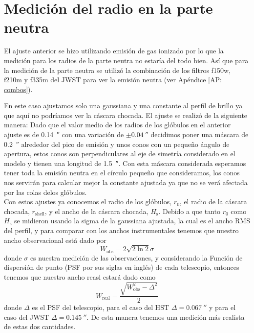 \documentclass{book}
\begin{document}
\section{Medición del radio en la parte neutra} \label{Sec : radio neutro}

El ajuste anterior se hizo utilizando emisión de gas ionizado por lo que la medición para los radios de la parte neutra no estaría del todo bien. Así que para la medición de la parte neutra se utilizó la combinación de los filtros f150w, f210m y f335m del JWST para ver la emisión neutra (ver Apéndice \ref{AP: combos}). 

En este caso ajustamos solo una gaussiana y una constante al perfil de brillo ya que aquí no podríamos ver la cáscara chocada. El ajuste se realizó de la siguiente manera: Dado que el valor medio de los radios de los glóbulos en el anterior ajuste es de  \SI{0.14}{\arcsecond} con una variación de $\pm\SI{0.04}{\arcsecond}$ decidimos poner una máscara de \SI{0.2}{\arcsecond} alrededor del pico de emisión y unos conos con un pequeño ángulo de apertura, estos conos son perpendiculares al eje de simetría considerado en el modelo y tienen una longitud de \SI{1.5}{\arcsecond}. Con esta máscara considerada esperamos tener toda la emisión neutra en el círculo pequeño que consideramos, los conos nos servirán para calcular mejor la constante ajustada ya que no se verá afectada por las colas delos glóbulos. \\

Con estos ajustes ya conocemos el radio de los glóbulos, $r_0$, el radio de la cáscara chocada, $r_\mathrm{shell}$, y el ancho de la cáscara chocada, $H_\mathrm{s}$.  
Debido a que tanto  $r_0$ como  $H_\mathrm{s}$ se midieron usando la sigma de la gaussiana ajustada, la cual es el ancho RMS del perfil, y para comparar con los anchos instrumentales tenemos que nuestro ancho observacional está dado por
\begin{equation}
    W_\mathrm{obs}= 2\sqrt{2\ln{2}}\sigma
\end{equation}
donde $\sigma$ es nuestra medición de las observaciones, y considerando la Función de dispersión de punto (PSF por sus siglas en inglés) de cada telescopio, entonces tenemos que nuestro ancho reasl estará dado como
\begin{equation}
    W_\mathrm{real} = \frac{\sqrt{W_\mathrm{obs}^2-\Delta^2}}{2}
\end{equation}
donde $\Delta$ es el PSF del telescopio, para el caso del HST $\Delta=\SI{0.067}{\arcsecond}$ y para el caso del JWST $\Delta=\SI{0.145}{\arcsecond}$. De esta manera tenemos una medición más realista de estas dos cantidades.
\end{document}
